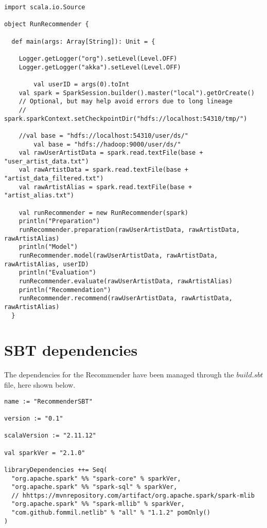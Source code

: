 \documentclass[11pt,a4paper,titlepage]{article}
\begin{document}
\begin{lstlisting}[style=myScalastyle]
import scala.io.Source

object RunRecommender {

  def main(args: Array[String]): Unit = {

    Logger.getLogger("org").setLevel(Level.OFF)
    Logger.getLogger("akka").setLevel(Level.OFF)

        val userID = args(0).toInt
    val spark = SparkSession.builder().master("local").getOrCreate()
    // Optional, but may help avoid errors due to long lineage
    // spark.sparkContext.setCheckpointDir("hdfs://localhost:54310/tmp/")

    //val base = "hdfs://localhost:54310/user/ds/"
        val base = "hdfs://hadoop:9000/user/ds/"
    val rawUserArtistData = spark.read.textFile(base + "user_artist_data.txt")
    val rawArtistData = spark.read.textFile(base + "artist_data_filtered.txt")
    val rawArtistAlias = spark.read.textFile(base + "artist_alias.txt")

    val runRecommender = new RunRecommender(spark)
    println("Preparation")
    runRecommender.preparation(rawUserArtistData, rawArtistData, rawArtistAlias)
    println("Model")
    runRecommender.model(rawUserArtistData, rawArtistData, rawArtistAlias, userID)
    println("Evaluation")
    runRecommender.evaluate(rawUserArtistData, rawArtistAlias)
    println("Recommendation")
    runRecommender.recommend(rawUserArtistData, rawArtistData, rawArtistAlias)
  }
\end{lstlisting}
\section{SBT dependencies}
The dependencies for the Recommender have been managed through the $build.sbt$ file, here shown below.

\begin{lstlisting}
name := "RecommenderSBT"

version := "0.1"

scalaVersion := "2.11.12"

val sparkVer = "2.1.0"

libraryDependencies ++= Seq(
  "org.apache.spark" %% "spark-core" % sparkVer,
  "org.apache.spark" %% "spark-sql" % sparkVer,
  // hhttps://mvnrepository.com/artifact/org.apache.spark/spark-mlib
  "org.apache.spark" %% "spark-mllib" % sparkVer,
  "com.github.fommil.netlib" % "all" % "1.1.2" pomOnly()
)
\end{lstlisting}
\end{document}
